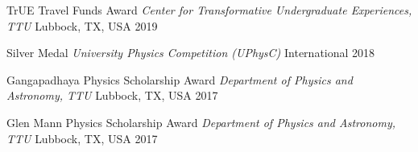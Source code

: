 \begin{cvhonors}
    \cvhonor
    {TrUE Travel Funds Award}
    {\textit{\scriptsize Center for Transformative Undergraduate Experiences, TTU}}
    {Lubbock, TX, USA}
    {2019}

    \cvhonor
    {Silver Medal}
    {\textit{\scriptsize University Physics Competition (UPhysC)}}
    {International}
    {2018}

    \cvhonor
    {Gangapadhaya Physics Scholarship Award}
    {\textit{\scriptsize Department of Physics and Astronomy, TTU}}
    {Lubbock, TX, USA}
    {2017}

    \cvhonor
    {Glen Mann Physics Scholarship Award}
    {\textit{\scriptsize Department of Physics and Astronomy, TTU}}
    {Lubbock, TX, USA}
    {2017}

\end{cvhonors}
